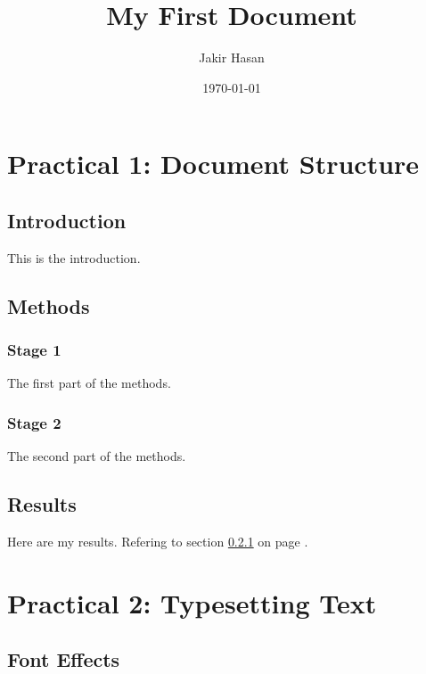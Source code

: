 \documentclass[a4paper, 12pt]{report}
\begin{document}
\title{My First Document}
\author{Jakir Hasan}
\date{\today}
\maketitle

\tableofcontents
\listoftables
\newpage
{}

\setcounter{chapter}{1}

\chapter*{Practical 1: Document Structure}

\section{Introduction}
This is the introduction.

\section{Methods}

\subsection{Stage 1}
\label{sec1}
The first part of the methods.

\subsection{Stage 2}
The second part of the methods.

\section{Results}
Here are my results. Refering to section \ref{sec1} on page \pageref{sec1}.


\setcounter{chapter}{2}
\chapter*{Practical 2: Typesetting Text}

\section{Font Effects}
\end{document}

